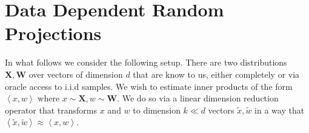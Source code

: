 \documentclass{article}
\theoremstyle{definition}
\theoremstyle{plain}
\newcommand{\X}{\mathbf{X}}
\newcommand{\W}{\mathbf{W}}
\newcommand{\ip}[1]{\left \langle #1 \right \rangle}
\begin{document}

\section{Data Dependent Random Projections}

In what follows we consider the following setup. There are two distributions $\X, \W$ over vectors of dimension $d$ that are know to us, either completely or via oracle access to i.i.d samples. We wish to estimate inner products of the form $\ip{x,w}$ where $x \sim \X, w \sim \W$. We do so via a linear dimension reduction operator that transforms $x$ and $w$ to dimension $k \ll d$ vectors $\tilde{x}, \tilde{w}$ in a way that $\ip{\tilde{x}, \tilde{w}} \approx \ip{x,w}$.
\end{document}
